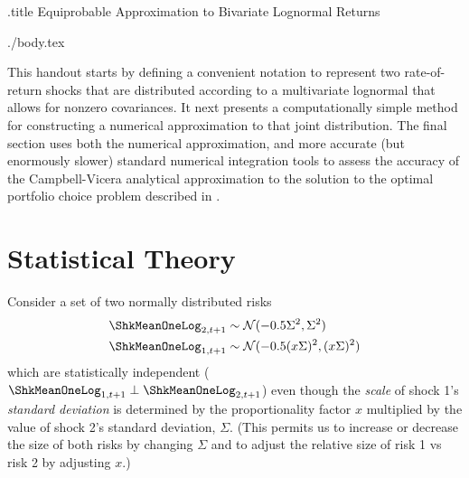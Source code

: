 \documentclass{handout}
\begin{document}
\handoutHeader

\begin{verbatimwrite}{\jobname.title}
Equiprobable Approximation to Bivariate Lognormal Returns
\end{verbatimwrite}

\handoutNameMake


\begin{verbatimwrite}{./body.tex}
  \newcommand{\sigAll}{\Sigma} %
  
\newcommand{\scale}{x}

This handout starts by defining a convenient notation to represent two rate-of-return shocks
that are distributed according to a multivariate lognormal that allows
for nonzero covariances.  It next presents a computationally
simple method for constructing a numerical approximation to that joint distribution.  The final
section uses both the numerical approximation, and more accurate (but enormously slower) standard numerical integration tools to assess the accuracy of the Campbell-Vicera analytical approximation to the solution to the optimal portfolio choice problem
described in .  

\section{Statistical Theory}

Consider a set of two normally distributed risks
\begin{equation*}\begin{gathered}\begin{aligned}
   \ShkMeanOneLog_{2,t+1} & \sim  \mathcal{N}(-0.5 \sigAll^{2},\sigAll^{2})
\\ \ShkMeanOneLog_{1,t+1} & \sim  \mathcal{N}(-0.5 (\scale \sigAll)^{2},(\scale \sigAll)^{2})
\end{aligned}\end{gathered}\end{equation*}
which are statistically independent ($\ShkMeanOneLog_{1,t+1} \perp \ShkMeanOneLog_{2,t+1}$) even though the {\it scale} of shock 1's
{\it standard deviation} is determined by the proportionality factor
$\scale$ multiplied by the value of shock 2's standard deviation,
$\sigAll$.  (This permits us to increase or decrease the size of both risks
by changing $\sigAll$ and to adjust the relative size of risk 1 vs risk 2 by adjusting $\scale$.)


\end{verbatimwrite}
\end{document}
